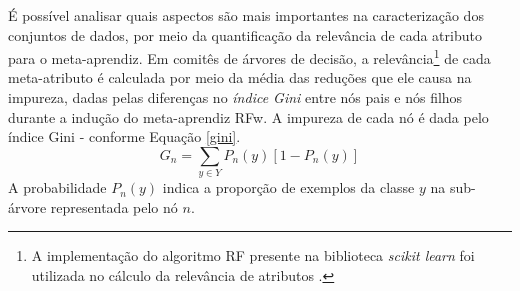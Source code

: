 É possível analisar quais aspectos são mais importantes na caracterização dos conjuntos de dados, por meio da quantificação da relevância de cada atributo para o meta-aprendiz.
Em comitês de árvores de decisão, a relevância\footnote{A implementação do algoritmo RF presente na biblioteca \textit{scikit learn} foi utilizada no cálculo da relevância de atributos \cite{scikit-learn}.} de cada meta-atributo \cite{books/wa/BreimanFOS84} é calculada por meio da média das reduções que ele causa na impureza, dadas pelas diferenças no \textit{índice Gini} entre nós pais e nós filhos durante a indução do meta-aprendiz RFw.
A impureza de cada nó é dada pelo índice Gini - conforme Equação \ref{gini}.
\begin{equation}\label{gini}
   G_n = \sum_{y \in Y} P_n(y) [1 - P_n(y)]
\end{equation}
A probabilidade $P_n(y)$ indica a proporção de exemplos da classe $y$ na sub-árvore representada pelo nó $n$.


